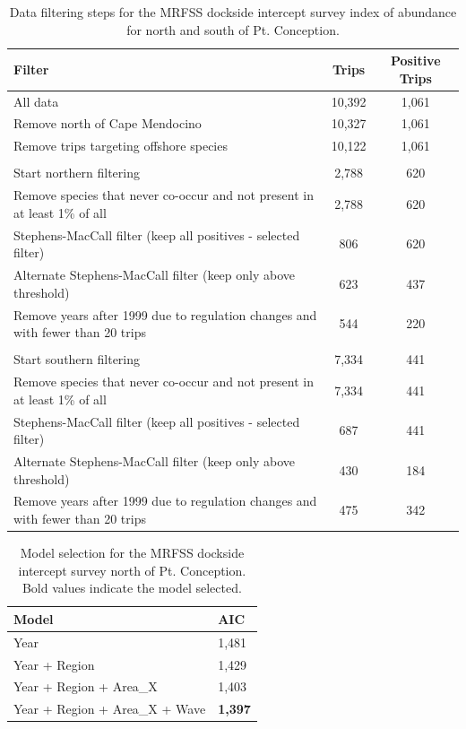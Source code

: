 \documentclass[12pt,]{article}
\begin{document}
\FloatBarrier

\begin{table}[ht]
\centering
\caption{Data filtering steps for the MRFSS dockside intercept survey 
                                           index of abundance for north and south of Pt. Conception.} 
\label{tab:Fleet10_11_Filter}
\begin{tabular}{>{\raggedright}p{4in}cc}
  \hline
Filter & Trips & Positive Trips \\ 
  \hline
All data & 10,392 & 1,061 \\ 
  Remove north of Cape Mendocino & 10,327 & 1,061 \\ 
  Remove trips targeting offshore species & 10,122 & 1,061 \\ 
   &  &  \\ 
  Start northern filtering & 2,788 & 620 \\ 
  Remove species that never co-occur and  not present in at least 1\% of all & 2,788 & 620 \\ 
  Stephens-MacCall filter (keep all positives - selected filter) & 806 & 620 \\ 
  Alternate Stephens-MacCall filter (keep only above threshold) & 623 & 437 \\ 
  Remove years after 1999 due to regulation changes and with fewer than 20 trips & 544 & 220 \\ 
   &  &  \\ 
  Start southern filtering & 7,334 & 441 \\ 
  Remove species that never co-occur and  not present in at least 1\% of all & 7,334 & 441 \\ 
  Stephens-MacCall filter (keep all positives - selected filter) & 687 & 441 \\ 
  Alternate Stephens-MacCall filter (keep only above threshold) & 430 & 184 \\ 
  Remove years after 1999 due to regulation changes and with fewer than 20 trips & 475 & 342 \\ 
   \hline
\end{tabular}
\end{table}

\vspace{3cm}

\begin{table}[ht]
\centering
\caption{Model selection for the MRFSS dockside intercept survey 
                                        north of Pt. Conception. Bold 
                                        values indicate the model selected.} 
\label{tab:Fleet10_AIC}
\begin{tabular}{ll}
  \hline
Model & AIC \\ 
  \hline
Year & 1,481 \\ 
  Year + Region & 1,429 \\ 
  Year + Region + Area\_X & 1,403 \\ 
  Year + Region + Area\_X + Wave & \textbf{1,397} \\ 
   \hline
\end{tabular}
\end{table}
\end{document}
